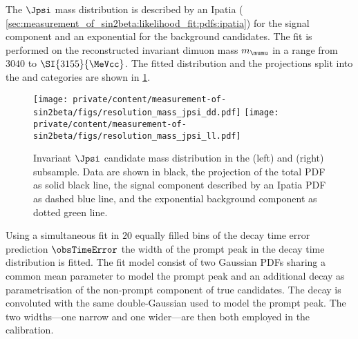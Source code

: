 The $\Jpsi$ mass distribution is described by an Ipatia \PDF (\cf
\cref{sec:measurement_of_sin2beta:likelihood_fit:pdfs:ipatia}) for the signal
component and an exponential \PDF for the background candidates. The fit is
performed on the reconstructed invariant dimuon mass $m_{\mumu}$ in a range from
$\num{3040}$ to $\SI{3155}{\MeVcc}$. The fitted distribution and the \PDF
projections split into the \catDD and \catLL categories are shown in 
\cref{fig:measurement_of_sin2beta:resolution_and_acceptance:resolution:jpsi_mass}.
%
\begin{figure}[h]
\texttt{[image: private/content/measurement-of-sin2beta/figs/resolution\_mass\_jpsi\_dd.pdf]}
\texttt{[image: private/content/measurement-of-sin2beta/figs/resolution\_mass\_jpsi\_ll.pdf]}
\caption{Invariant $\Jpsi$ candidate mass distribution in the (left) \catDD and
(right) \catLL subsample. Data are shown in black, the projection of the total
\acs{PDF} as solid black line, the signal component described by an Ipatia
\acs{PDF} as dashed blue line, and the exponential background component as
dotted green line.}
\label{fig:measurement_of_sin2beta:resolution_and_acceptance:resolution:jpsi_mass}
\end{figure}
%
Using a simultaneous fit in $\num{20}$ equally filled bins of the decay time
error prediction $\obsTimeError$ the width of the prompt peak in the decay time
distribution is fitted. The fit model consist of two Gaussian \acp{PDF} sharing
a common mean parameter to model the prompt peak and an additional decay \PDF as
parametrisation of the non-prompt component of true \BdToJpsiKS candidates. The
decay \PDF is convoluted with the same double-Gaussian \PDF used to model the
prompt peak. The two widths---one narrow and one wider---are then both employed
in the calibration.

